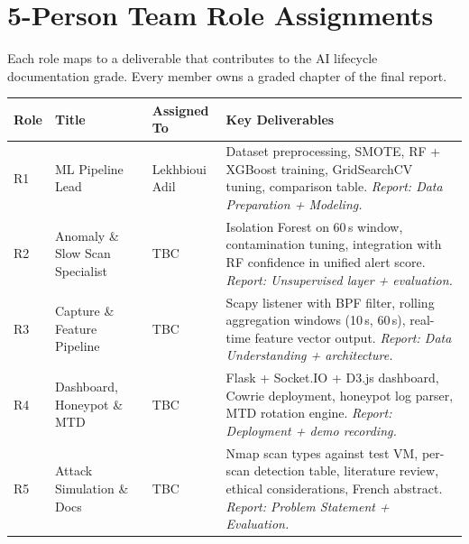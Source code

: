 \documentclass[12pt,a4paper]{article}
\begin{document}
\section{5-Person Team Role Assignments}

Each role maps to a deliverable that contributes to the AI lifecycle
documentation grade. Every member owns a graded chapter of the final report.

\begin{table}[h!]
\centering
\small
\begin{tabular}{C{1cm} L{3.5cm} L{3cm} L{6.5cm}}
  \toprule
  \textbf{Role} & \textbf{Title} & \textbf{Assigned To} & \textbf{Key Deliverables} \\
  \midrule
  R1 & ML Pipeline Lead & Lekhbioui Adil &
       Dataset preprocessing, SMOTE, RF + XGBoost training,
       GridSearchCV tuning, comparison table.
       \newline\textit{Report: Data Preparation + Modeling.} \\
  \midrule
  R2 & Anomaly \& Slow Scan Specialist & TBC &
       Isolation Forest on 60\,s window, contamination tuning,
       integration with RF confidence in unified alert score.
       \newline\textit{Report: Unsupervised layer + evaluation.} \\
  \midrule
  R3 & Capture \& Feature Pipeline & TBC &
       Scapy listener with BPF filter, rolling aggregation
       windows (10\,s, 60\,s), real-time feature vector output.
       \newline\textit{Report: Data Understanding + architecture.} \\
  \midrule
  R4 & Dashboard, Honeypot \& MTD & TBC &
       Flask + Socket.IO + D3.js dashboard, Cowrie deployment,
       honeypot log parser, MTD rotation engine.
       \newline\textit{Report: Deployment + demo recording.} \\
  \midrule
  R5 & Attack Simulation \& Docs & TBC &
       Nmap scan types against test VM, per-scan detection table,
       literature review, ethical considerations, French abstract.
       \newline\textit{Report: Problem Statement + Evaluation.} \\
  \bottomrule
\end{tabular}
\end{table}
\end{document}
